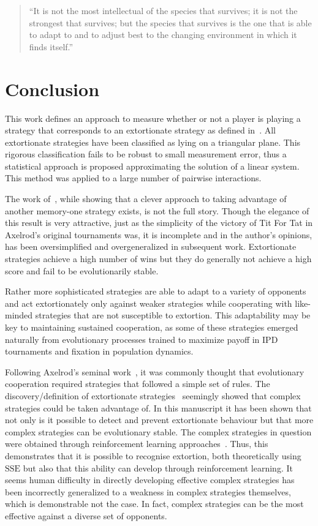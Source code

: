 \documentclass[a4paper]{article}
\newcommand{\SSe}{\text{SSE}}
\begin{document}
\begin{quote}
``It is not the most intellectual of the species that survives; it is not the
strongest that survives; but the species that survives is the one that is able
to adapt to and to adjust best to the changing environment in which it finds
itself.''
\end{quote}

\section{Conclusion}\label{sec:conclusion}

This work defines an approach to measure whether or not a player is playing a
strategy that corresponds to an extortionate strategy as defined
in~\cite{Press2012}. All extortionate
strategies have been classified as lying on a triangular plane.  This rigorous
classification fails to be robust to small measurement error, thus a statistical
approach is proposed approximating the solution of a linear system. This method
was applied to a large number of pairwise interactions.

The work of~\cite{Press2012}, while showing that a clever approach to taking
advantage of another memory-one strategy exists, is not the full story.
Though the elegance of this result is very attractive, just as the simplicity of
the victory of Tit For Tat in Axelrod's original tournaments was, it is
incomplete and in the author's opinions, has been oversimplified and
overgeneralized in subsequent work. Extortionate strategies achieve a high
number of wins but they do generally not achieve a high score and fail to be
evolutionarily stable.

Rather more sophisticated strategies are able to adapt to a variety of opponents
and act extortionately only against weaker strategies while cooperating with
like-minded strategies that are not susceptible to extortion. This adaptability
may be key to maintaining sustained cooperation, as some of these strategies
emerged naturally from evolutionary processes trained to maximize payoff in
IPD tournaments and fixation in population dynamics.

Following Axelrod's seminal work~\cite{Axelrod1980, Axelrod1980a}, it was
commonly thought that evolutionary cooperation required strategies that followed
a simple set of rules. The discovery/definition of extortionate
strategies~\cite{Press2012} seemingly showed that complex strategies could be
taken advantage of. In this manuscript it has been shown that not only is it
possible to detect and prevent extortionate behaviour but that more complex
strategies can be evolutionary stable. The complex strategies in question were
obtained through reinforcement learning approaches~\cite{Harper2017, Moran1707}.
Thus, this demonstrates that it is possible to recognise extortion, both
theoretically using \(\SSe\) but also that this ability can develop through
reinforcement learning. It seems human difficulty in directly developing
effective complex strategies has been incorrectly generalized to a weakness
in complex strategies themselves, which is demonstrable not the case. In fact,
complex strategies can be the most effective against a diverse set of opponents.
\end{document}
